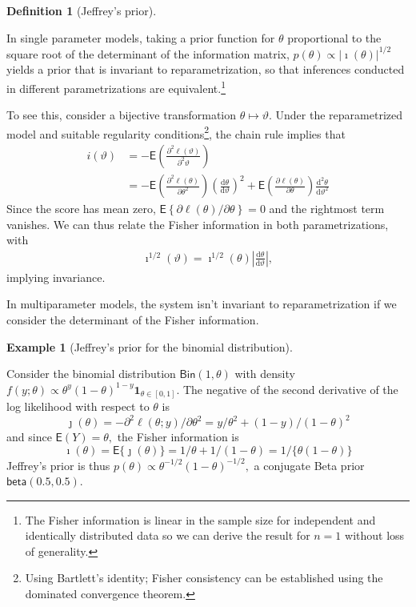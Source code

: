 \documentclass[
  11pt,
  letterpaper,
]{scrbook}
\theoremstyle{definition}
\newtheorem{example}{Example}[chapter]
\theoremstyle{plain}
\theoremstyle{plain}
\theoremstyle{plain}
\theoremstyle{definition}
\theoremstyle{definition}
\newtheorem{definition}{Definition}[chapter]
\theoremstyle{plain}
\theoremstyle{plain}
\theoremstyle{remark}
\begin{document}
\begin{definition}[Jeffrey's
prior]\protect\hypertarget{def-jeffreys}{}\label{def-jeffreys}

In single parameter models, taking a prior function for \(\theta\)
proportional to the square root of the determinant of the information
matrix, \(p(\theta) \propto |\imath(\theta)|^{1/2}\) yields a prior that
is invariant to reparametrization, so that inferences conducted in
different parametrizations are equivalent.\footnote{The Fisher
  information is linear in the sample size for independent and
  identically distributed data so we can derive the result for \(n=1\)
  without loss of generality.}

To see this, consider a bijective transformation
\(\theta \mapsto \vartheta.\) Under the reparametrized model and
suitable regularity conditions\footnote{Using Bartlett's identity;
  Fisher consistency can be established using the dominated convergence
  theorem.}, the chain rule implies that \begin{align*}
i(\vartheta) &= - \mathsf{E} \left(\frac{\partial^2 \ell(\vartheta)}{\partial^2 \vartheta}\right)
\\&= - \mathsf{E}\left(\frac{\partial^2 \ell(\theta)}{\partial \theta^2}\right) \left( \frac{\mathrm{d} \theta}{\mathrm{d} \vartheta} \right)^2 + \mathsf{E}\left(\frac{\partial \ell(\theta)}{\partial \theta}\right) \frac{\mathrm{d}^2 \theta}{\mathrm{d} \vartheta^2}
\end{align*} Since the score has mean zero,
\(\mathsf{E}\left\{\partial \ell(\theta)/\partial \theta\right\}=0\) and
the rightmost term vanishes. We can thus relate the Fisher information
in both parametrizations, with \begin{align*}
\imath^{1/2}(\vartheta) = \imath^{1/2}(\theta) \left| \frac{\mathrm{d} \theta}{\mathrm{d} \vartheta} \right|,
\end{align*} implying invariance.

In multiparameter models, the system isn't invariant to
reparametrization if we consider the determinant of the Fisher
information.

\end{definition}

\begin{example}[Jeffrey's prior for the binomial
distribution]\protect\hypertarget{exm-jeffreysbinom}{}\label{exm-jeffreysbinom}

Consider the binomial distribution \(\mathsf{Bin}(1, \theta)\) with
density
\(f(y; \theta) \propto  \theta^y(1-\theta)^{1-y}\mathbf{1}_{\theta \in [0,1]}.\)
The negative of the second derivative of the log likelihood with respect
to \(\theta\) is
\[\jmath(\theta) = - \partial^2 \ell(\theta; y) / \partial \theta^2 = y/\theta^2 + (1-y)/(1-\theta)^2\]
and since \(\mathsf{E}(Y)=\theta,\) the Fisher information is
\[\imath(\theta) = \mathsf{E}\{\jmath(\theta)\}=1/\theta + 1/(1-\theta) = 1/\{\theta(1-\theta)\}\]
Jeffrey's prior is thus
\(p(\theta) \propto \theta^{-1/2}(1-\theta)^{-1/2},\) a conjugate Beta
prior \(\mathsf{beta}(0.5,0.5).\)

\end{example}
\end{document}
